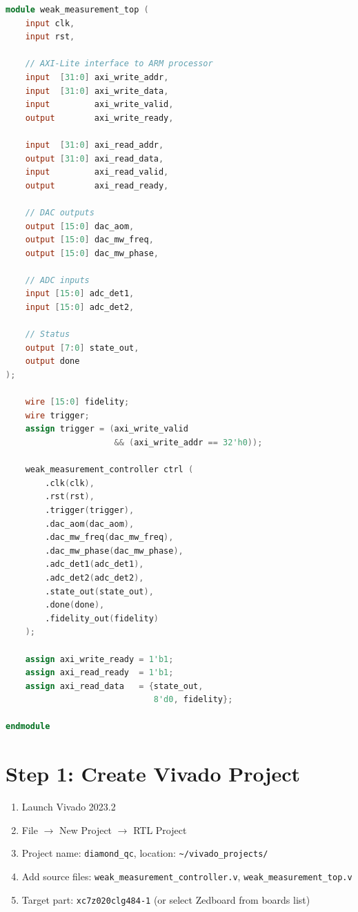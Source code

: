 \documentclass[11pt,a4paper,openany]{book}
\begin{document}
\begin{lstlisting}[language=Verilog,caption={weak\_measurement\_top.v --- AXI wrapper}]
module weak_measurement_top (
    input clk,
    input rst,

    // AXI-Lite interface to ARM processor
    input  [31:0] axi_write_addr,
    input  [31:0] axi_write_data,
    input         axi_write_valid,
    output        axi_write_ready,

    input  [31:0] axi_read_addr,
    output [31:0] axi_read_data,
    input         axi_read_valid,
    output        axi_read_ready,

    // DAC outputs
    output [15:0] dac_aom,
    output [15:0] dac_mw_freq,
    output [15:0] dac_mw_phase,

    // ADC inputs
    input [15:0] adc_det1,
    input [15:0] adc_det2,

    // Status
    output [7:0] state_out,
    output done
);

    wire [15:0] fidelity;
    wire trigger;
    assign trigger = (axi_write_valid
                      && (axi_write_addr == 32'h0));

    weak_measurement_controller ctrl (
        .clk(clk),
        .rst(rst),
        .trigger(trigger),
        .dac_aom(dac_aom),
        .dac_mw_freq(dac_mw_freq),
        .dac_mw_phase(dac_mw_phase),
        .adc_det1(adc_det1),
        .adc_det2(adc_det2),
        .state_out(state_out),
        .done(done),
        .fidelity_out(fidelity)
    );

    assign axi_write_ready = 1'b1;
    assign axi_read_ready  = 1'b1;
    assign axi_read_data   = {state_out,
                              8'd0, fidelity};

endmodule
\end{lstlisting}

\section{Step 1: Create Vivado Project}

\begin{enumerate}[nosep]
  \item Launch Vivado 2023.2
  \item File $\to$ New Project $\to$ RTL Project
  \item Project name: \texttt{diamond\_qc}, location: \texttt{\textasciitilde/vivado\_projects/}
  \item Add source files: \texttt{weak\_measurement\_controller.v}, \texttt{weak\_measurement\_top.v}
  \item Target part: \texttt{xc7z020clg484-1} (or select Zedboard from boards list)
\end{enumerate}
\end{document}
